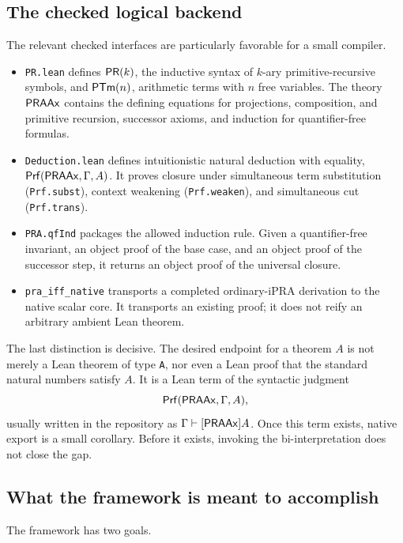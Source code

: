 \subsection{The checked logical backend}

The relevant checked interfaces are particularly favorable for a small compiler.

\begin{itemize}
  \item \texttt{PR.lean} defines \(\mathsf{PR}(k)\), the inductive syntax of \(k\)-ary primitive-recursive
        symbols, and \(\mathsf{PTm}(n)\), arithmetic terms with \(n\) free variables.  The theory
        \(\mathsf{PRAAx}\) contains the defining equations for projections, composition, and primitive recursion,
        successor axioms, and induction for quantifier-free formulas.
  \item \texttt{Deduction.lean} defines intuitionistic natural deduction with equality,
        \(\mathsf{Prf}(\mathsf{PRAAx},\Gamma,A)\).  It proves closure under simultaneous term substitution
        (\texttt{Prf.subst}), context weakening (\texttt{Prf.weaken}), and simultaneous cut
        (\texttt{Prf.trans}).
  \item \texttt{PRA.qfInd} packages the allowed induction rule.  Given a quantifier-free invariant,
        an object proof of the base case, and an object proof of the successor step, it returns an object
        proof of the universal closure.
  \item \texttt{pra\_iff\_native} transports a completed ordinary-iPRA derivation to the native scalar
        core.  It transports an existing proof; it does not reify an arbitrary ambient Lean theorem.
\end{itemize}

The last distinction is decisive.  The desired endpoint for a theorem \(A\) is not merely a Lean theorem
of type \texttt{A}, nor even a Lean proof that the standard natural numbers satisfy \(A\).  It is a Lean
term of the syntactic judgment
\[
  \mathsf{Prf}(\mathsf{PRAAx},\Gamma,A),
\]
usually written in the repository as \(\Gamma\vdash[\mathsf{PRAAx}]A\).  Once this term exists, native export is a
small corollary.  Before it exists, invoking the bi-interpretation does not close the gap.

\subsection{What the framework is meant to accomplish}

The framework has two goals.

